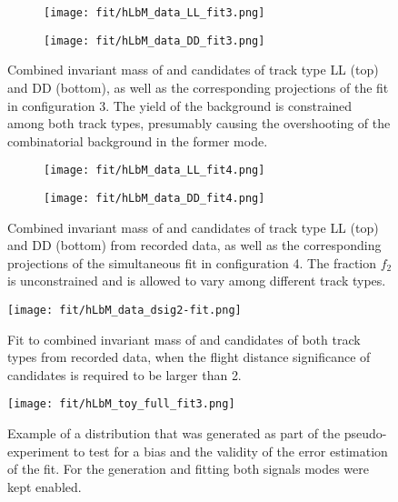 \begin{figure}[htbp]
    \centering
    \begin{subfigure}[b]{\textwidth}
        \centering
        \texttt{[image: fit/hLbM\_data\_LL\_fit3.png]}
    \end{subfigure}
    \par\bigskip 
    \begin{subfigure}[b]{\textwidth}
        \centering
        \texttt{[image: fit/hLbM\_data\_DD\_fit3.png]}
    \end{subfigure}
    \caption{Combined invariant mass of \Dz and \Lz candidates of track type \gls{LL} (top) and \gls{DD} (bottom), as well as the corresponding projections of the fit in configuration 3. The yield of the \Dstarz background is constrained among both track types, presumably causing the overshooting of the combinatorial background in the former mode.}
    \label{fig:fit_hLbM_data_fit3}
\end{figure}

\begin{figure}[htbp]
    \centering
    \begin{subfigure}[b]{\textwidth}
        \centering
        \texttt{[image: fit/hLbM\_data\_LL\_fit4.png]}
    \end{subfigure}
    \par\bigskip 
    \begin{subfigure}[b]{\textwidth}
        \centering
        \texttt{[image: fit/hLbM\_data\_DD\_fit4.png]}
    \end{subfigure}
    \caption{Combined invariant mass of \Dz and \Lz candidates of track type \gls{LL} (top) and \gls{DD} (bottom) from recorded data, as well as the corresponding projections of the simultaneous fit in configuration 4. The fraction $f_2$ is unconstrained and is allowed to vary among different track types.}
    \label{fig:fit_hLbM_data_fit4}
\end{figure}

\begin{figure}[htbp]
    \centering
    \texttt{[image: fit/hLbM\_data\_dsig2-fit.png]}
    \caption{Fit to combined invariant mass of \Dz and \Lz candidates of both track types from recorded data, when the flight distance significance of \Dz candidates is required to be larger than 2.}
    \label{fig:fit_hLbM_dsig2}
\end{figure}

\begin{figure}[htbp]
    \centering
    \texttt{[image: fit/hLbM\_toy\_full\_fit3.png]}
    \caption{Example of a distribution that was generated as part of the pseudo-experiment to test for a bias and the validity of the error estimation of the fit. For the generation and fitting both signals modes were kept enabled.}
    \label{fig:fit_hLbM_toy_full_fit3}
\end{figure}

